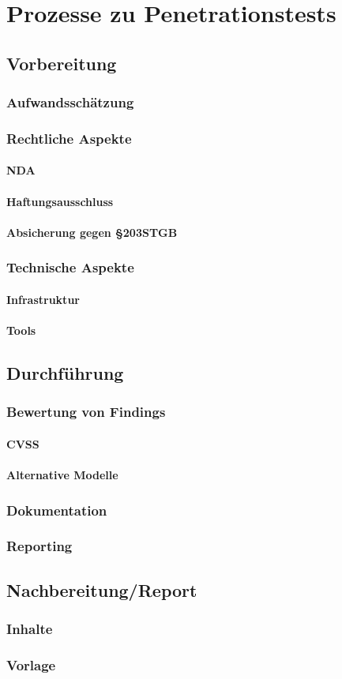 \chapter{Prozesse zu Penetrationstests}
	\section{Vorbereitung}
		\subsection{Aufwandsschätzung}
		\subsection{Rechtliche Aspekte}
			\subsubsection{NDA}
			\subsubsection{Haftungsausschluss}
			\subsubsection{Absicherung gegen §203STGB}
			\subsection{Technische Aspekte}
				\subsubsection{Infrastruktur}
				\subsubsection{Tools}
	\section{Durchführung}
		\subsection{Bewertung von Findings}
			\subsubsection{CVSS}
			\subsubsection{Alternative Modelle}
		\subsection{Dokumentation}	            	
            	\subsection{Reporting}    	
	\section{Nachbereitung/Report}
			\subsection{Inhalte}
			\subsection{Vorlage}